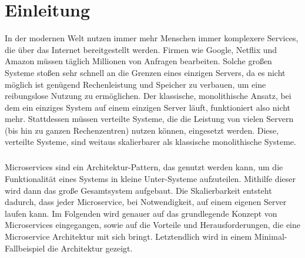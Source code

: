 \chapter{Einleitung}

In der modernen Welt nutzen immer mehr Menschen immer komplexere Services, die über das Internet bereitgestellt werden. Firmen wie Google, Netflix und Amazon müssen täglich Millionen von Anfragen bearbeiten. Solche großen Systeme stoßen sehr schnell an die Grenzen eines einzigen Servers, da es nicht möglich ist genügend Rechenleistung und Speicher zu verbauen, um eine reibungslose Nutzung zu ermöglichen. Der klassische, monolithische Ansatz, bei dem ein einziges System auf einem einzigen Server läuft, funktioniert also nicht mehr. Stattdessen müssen verteilte Systeme, die die Leistung von vielen Servern (bis hin zu ganzen Rechenzentren) nutzen können, eingesetzt werden. Diese, verteilte Systeme, sind weitaus skalierbarer als klassische monolithische Systeme.
\paragraph{}
Microservices sind ein Architektur-Pattern, das genutzt werden kann, um die Funktionalität eines Systems in kleine Unter-Systeme aufzuteilen. Mithilfe dieser wird dann das große Gesamtsystem aufgebaut. Die Skalierbarkeit entsteht dadurch, dass jeder Microservice, bei Notwendigkeit, auf einem eigenen Server laufen kann. Im Folgenden wird genauer auf das grundlegende Konzept von Microservices eingegangen, sowie auf die Vorteile und Herausforderungen, die eine Microservice Architektur mit sich bringt. Letztendlich wird in einem Minimal-Fallbeispiel die Architektur gezeigt.
